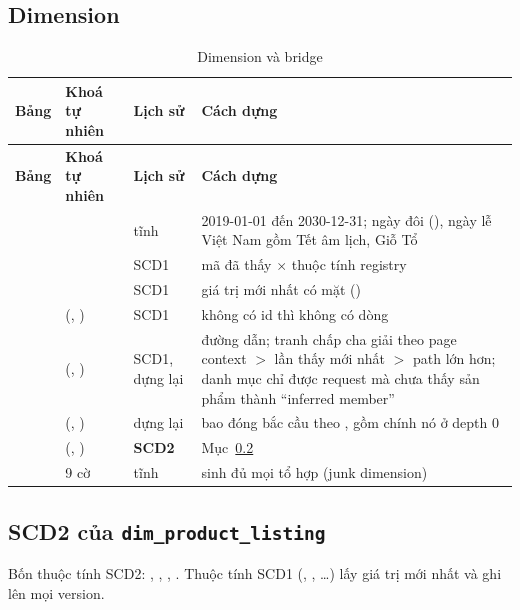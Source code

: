 \subsection{Dimension}
\begin{xltabular}{\linewidth}{@{}L{38mm}L{32mm}L{20mm}Y@{}}
  \caption{Dimension và bridge}\label{tab:dims}\\
  \toprule
  \textbf{Bảng} & \textbf{Khoá tự nhiên} & \textbf{Lịch sử} & \textbf{Cách dựng} \\
  \midrule
  \endfirsthead
  \toprule \textbf{Bảng} & \textbf{Khoá tự nhiên} & \textbf{Lịch sử} & \textbf{Cách dựng} \\ \midrule
  \endhead
   &  & tĩnh & 2019-01-01 đến 2030-12-31; ngày đôi (), ngày lễ Việt Nam gồm Tết âm lịch, Giỗ Tổ \\
   &  & SCD1 & mã đã thấy $\times$ thuộc tính registry \\
   &  & SCD1 & giá trị mới nhất có mặt () \\
   & (, ) & SCD1 & không có id thì không có dòng \\
   & (, ) & SCD1, dựng lại &  đường dẫn; tranh chấp cha giải theo page context $>$ lần thấy mới nhất $>$ path lớn hơn; danh mục chỉ được request mà chưa thấy sản phẩm thành ``inferred member'' \\
   & (, ) & dựng lại & bao đóng bắc cầu theo , gồm chính nó ở depth 0 \\
   & (, ) & \textbf{SCD2} & Mục~\ref{sec:scd2} \\
   & 9 cờ & tĩnh & sinh đủ mọi tổ hợp (junk dimension) \\
  \bottomrule
\end{xltabular}

\subsection{SCD2 của \texttt{dim\_product\_listing}}\label{sec:scd2}
Bốn thuộc tính SCD2: , , , . Thuộc tính SCD1
(, , \ldots) lấy giá trị mới nhất và ghi lên mọi version.

